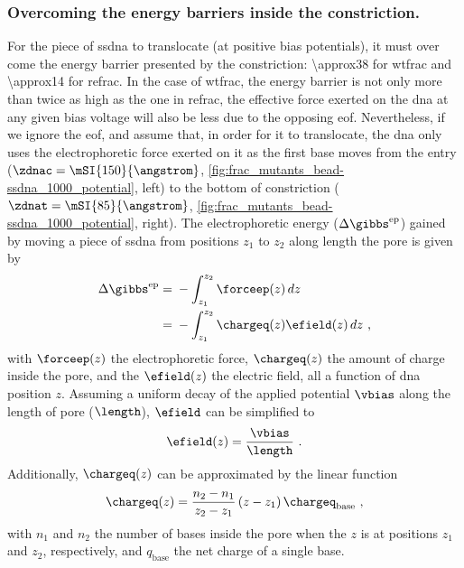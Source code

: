 \subsubsection{Overcoming the energy barriers inside the constriction.}
%
For the piece of \gls{ssdna} to translocate (at positive bias potentials), it must over come the energy
barrier presented by the constriction: \SI{\approx38}{\kT} for \gls{wtfrac} and \SI{\approx14}{\kT} for
\gls{refrac}. In the case of \gls{wtfrac}, the energy barrier is not only more than twice as high as the one
in \gls{refrac}, the effective force exerted on the \gls{dna} at any given bias voltage will also be less due
to the opposing \gls{eof}. Nevertheless, if we ignore the \gls{eof}, and assume that, in order for it to
translocate, the \gls{dna} only uses the electrophoretic force exerted on it as the first base moves from the
\cisi{} entry ($\zdnac = \mSI{150}{\angstrom}$, \cref{fig:frac_mutants_bead-ssdna_1000_potential}, left) to
the bottom of \transi{} constriction ($\zdnat = \mSI{85}{\angstrom}$,
\cref{fig:frac_mutants_bead-ssdna_1000_potential}, right). The electrophoretic energy ($\Delta
\gibbs^{\textrm{ep}}$) gained by moving a piece of \gls{ssdna} from positions $z_1$ to $z_2$ along length the
pore is given by
%
\begin{align}\label{eq:ep_energy}
  \Delta \gibbs^{\textrm{ep}} ={}& - \int_{z_1}^{z_2} \forceep (z) \,dz \nonumber \\
                              ={}& - \int_{z_1}^{z_2} \chargeq (z) \efield (z) \,dz
  \text{ ,}
\end{align}
%
with $\forceep (z)$ the electrophoretic force, $\chargeq (z)$ the amount of charge inside the pore, and the
$\efield (z)$ the electric field, all a function of \gls{dna} position $z$. Assuming a uniform decay of the
applied potential $\vbias$ along the length of pore ($\length$), $\efield$ can be simplified to
%
\begin{equation}\label{eq:linear_efield}
  \efield (z) = \dfrac{\vbias}{\length}
  \text{ .}
\end{equation}
%
Additionally, $\chargeq (z)$ can be approximated by the linear function
%
\begin{equation}\label{eq:ssdna_charge_in_pore}
  \chargeq (z) = 
        \dfrac{ n_2 - n_1 } { z_2 - z_1 } 
        \left( z - z_1 \right) \chargeq_{\textrm{base}}
  \text{ ,}
\end{equation}
%
with $n_1$ and $n_2$ the number of bases inside the pore when the $z$ is at positions $z_1$ and $z_2$,
respectively, and $q_{\textrm{base}}$ the net charge of a single base.

